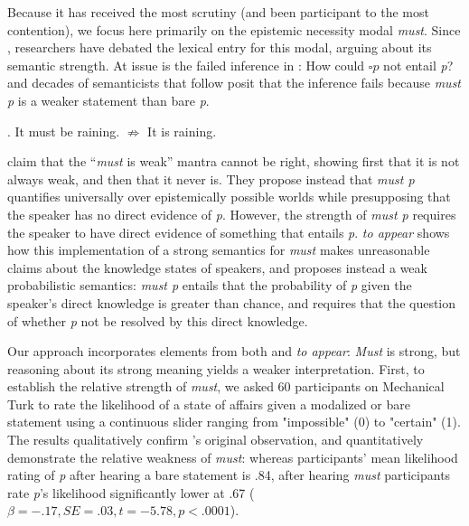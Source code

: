 \documentclass[12pt]{article}
\begin{document}
\noindent Because it has received the most scrutiny (and been participant to the most contention), we focus here primarily on the epistemic necessity modal \emph{must}. Since \citealt{karttunen1972}, researchers have debated the lexical entry for this modal, arguing about its semantic strength. At issue is the failed inference in \Next: How could $\square$\hspace{2pt}$p$ not entail \emph{p}? \citeauthor{karttunen1972} and decades of semanticists that follow posit that the inference fails because \emph{must p} is a weaker statement than bare \emph{p}.

\ex. It must be raining. \hfil $\nRightarrow$ \hfil It is raining.

\citealt{vonfintelgillies2010} claim that the ``\emph{must} is weak'' mantra cannot be right, showing first that it is not always weak, and then that it never is. They propose instead that \emph{must p} quantifies universally over epistemically possible worlds while presupposing that the speaker has no direct evidence of \emph{p}. However, the strength of \emph{must p} requires the speaker to have direct evidence of something that entails \emph{p}.  \citeauthor{lassiter2014salt} \emph{to appear} shows how this implementation of a strong semantics for \emph{must} makes unreasonable claims about the knowledge states of speakers, and proposes instead a weak probabilistic semantics: \emph{must p} entails that the probability of \emph{p} given the speaker's direct knowledge is greater than chance, and requires that the question of whether \emph{p} not be resolved by this direct knowledge.

Our approach incorporates elements from both \citealt{vonfintelgillies2010} and \citeauthor{lassiter2014salt} \emph{to appear}: \emph{Must} is strong, but reasoning about its strong meaning yields a weaker interpretation. First, to establish the relative strength of \emph{must}, we asked 60 participants on Mechanical Turk to rate the likelihood of a state of affairs given a modalized or bare statement using a continuous slider ranging from "impossible" (0) to "certain" (1). The results qualitatively confirm \citeauthor{karttunen1972}'s original observation, and quantitatively demonstrate the relative weakness of \emph{must}: whereas participants' mean likelihood rating of \emph{p} after hearing a bare statement is .84, after hearing \emph{must} %
participants rate \emph{p}'s likelihood significantly lower at .67 ($\beta=-.17, SE=.03, t=-5.78, p<.0001$). 
\end{document}
